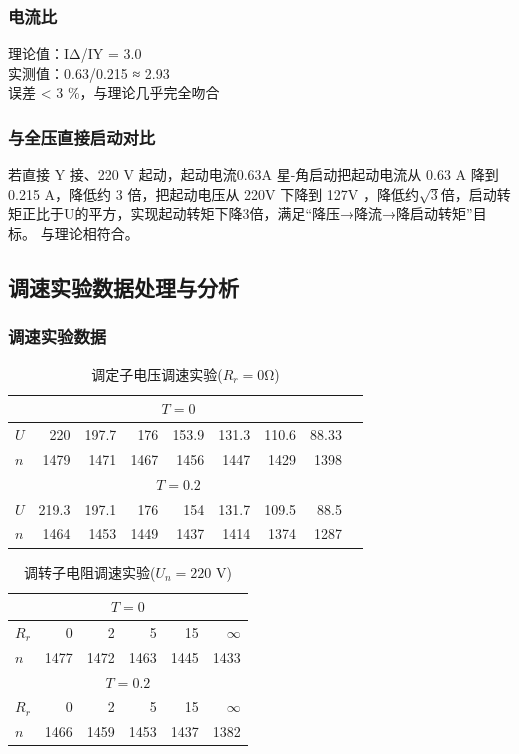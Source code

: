 \documentclass[12pt,a4paper]{article}
\begin{document}
\subsubsection{电流比}
\noindent 理论值：IΔ/IY = 3.0\\
实测值：0.63/0.215 ≈ 2.93\\
误差 < 3 \%，与理论几乎完全吻合
\subsubsection{与全压直接启动对比}
若直接 Y 接、220 V 起动，起动电流0.63A
星-角启动把起动电流从 0.63 A 降到 0.215 A，降低约 3 倍，把起动电压从 220V 下降到 127V
，降低约$\sqrt{3}$倍，启动转矩正比于U的平方，实现起动转矩下降3倍，满足“降压→降流→降启动转矩”目标。
与理论相符合。
\subsection{调速实验数据处理与分析}

\subsubsection{调速实验数据}

\begin{table}[H]
\centering
\caption{调定子电压调速实验($R_r=0$Ω)}
\begin{tabular}{lrrrrrrrr}
\toprule
\multicolumn{8}{c}{$T=0$} \\
\midrule
$U$ & 220 & 197.7 & 176 & 153.9 & 131.3 & 110.6 & 88.33 \\
$n$ & 1479 & 1471 & 1467 & 1456 & 1447 & 1429 & 1398 \\
\midrule
\multicolumn{8}{c}{$T=0.2$} \\
\midrule
$U$ & 219.3 & 197.1 & 176 & 154 & 131.7 & 109.5 & 88.5 \\
$n$ & 1464 & 1453 & 1449 & 1437 & 1414 & 1374 & 1287 \\
\bottomrule
\end{tabular}
\end{table}

\begin{table}[H]
\centering
\caption{调转子电阻调速实验($U_n=220$ V)}
\begin{tabular}{lrrrrr}
\toprule
\multicolumn{6}{c}{$T=0$} \\
\midrule
$R_r$ & 0 & 2 & 5 & 15 & $\infty$ \\
$n$ & 1477&	1472&	1463&	1445&	1433 \\
\midrule
\multicolumn{6}{c}{$T=0.2$} \\
\midrule
$R_r$ & 0 & 2 & 5 & 15 & $\infty$ \\
$n$ & 1466 & 1459 & 1453 & 1437 & 1382 \\
\bottomrule
\end{tabular}
\end{table}
\end{document}

